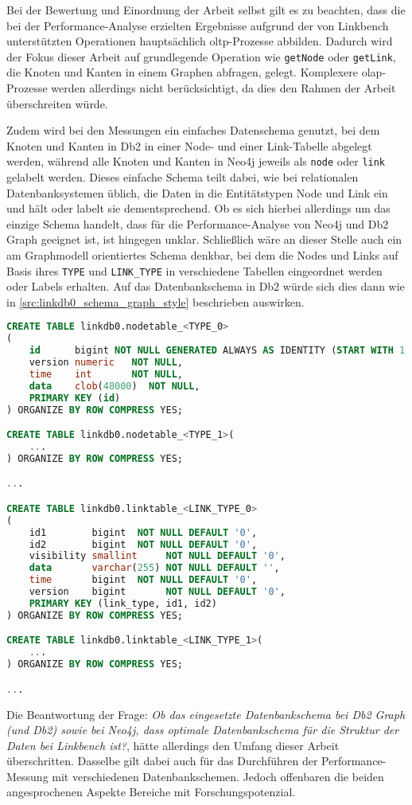 Bei der Bewertung und Einordnung der Arbeit selbst gilt es zu beachten, dass die bei der Performance-Analyse erzielten Ergebnisse aufgrund der von Linkbench unterstützten Operationen hauptsächlich \acs{oltp}-Prozesse abbilden. Dadurch wird der Fokus dieser Arbeit auf grundlegende Operation wie \texttt{getNode} oder \texttt{getLink}, die Knoten und Kanten in einem Graphen abfragen, gelegt. Komplexere \acs{olap}-Prozesse werden allerdings nicht berücksichtigt, da dies den Rahmen der Arbeit überschreiten würde. 

Zudem wird bei den Messungen ein einfaches Datenschema genutzt, bei dem Knoten und Kanten in Db2 in einer Node- und einer Link-Tabelle abgelegt werden, während alle Knoten und Kanten in Neo4j jeweils als \texttt{node} oder \texttt{link} gelabelt werden. Dieses einfache Schema teilt dabei, wie bei relationalen Datenbanksystemen üblich, die Daten in die Entitätstypen Node und Link ein und hält oder labelt sie dementsprechend. Ob es sich hierbei allerdings um das einzige Schema handelt, dass für die Performance-Analyse von Neo4j und Db2 Graph geeignet ist, ist hingegen unklar. Schließlich wäre an dieser Stelle auch ein am Graphmodell orientiertes Schema denkbar, bei dem die Nodes und Links auf Basis ihres \texttt{TYPE} und \texttt{LINK\_TYPE} in verschiedene Tabellen eingeordnet werden oder Labels erhalten. Auf das Datenbankschema in Db2 würde sich dies dann wie in \autoref{src:linkdb0_schema_graph_style} beschrieben auswirken. 
\begin{lstlisting}[label=src:linkdb0_schema_graph_style,caption={Alternatives Datenbankschema für Db2},language=SQL]
CREATE TABLE linkdb0.nodetable_<TYPE_0>
(
    id      bigint NOT NULL GENERATED ALWAYS AS IDENTITY (START WITH 1 INCREMENT BY 1),
    version numeric   NOT NULL,
    time    int       NOT NULL,
    data    clob(48000)  NOT NULL,
    PRIMARY KEY (id)
) ORGANIZE BY ROW COMPRESS YES;

CREATE TABLE linkdb0.nodetable_<TYPE_1>(
    ...
) ORGANIZE BY ROW COMPRESS YES;

...

CREATE TABLE linkdb0.linktable_<LINK_TYPE_0>
(
    id1        bigint  NOT NULL DEFAULT '0',
    id2        bigint  NOT NULL DEFAULT '0',
    visibility smallint     NOT NULL DEFAULT '0',
    data       varchar(255) NOT NULL DEFAULT '',
    time       bigint  NOT NULL DEFAULT '0',
    version    bigint       NOT NULL DEFAULT '0',
    PRIMARY KEY (link_type, id1, id2)
) ORGANIZE BY ROW COMPRESS YES;

CREATE TABLE linkdb0.linktable_<LINK_TYPE_1>(
    ...
) ORGANIZE BY ROW COMPRESS YES;

...
\end{lstlisting}
Die Beantwortung der Frage: \textit{Ob das eingesetzte Datenbankschema bei Db2 Graph (und Db2) sowie bei Neo4j, dass optimale Datenbankschema für die Struktur der Daten bei Linkbench ist?}, hätte allerdings den Umfang dieser Arbeit überschritten. Dasselbe gilt dabei auch für das Durchführen der Performance-Messung mit verschiedenen Datenbankschemen. Jedoch offenbaren die beiden angesprochenen Aspekte Bereiche mit Forschungspotenzial.

